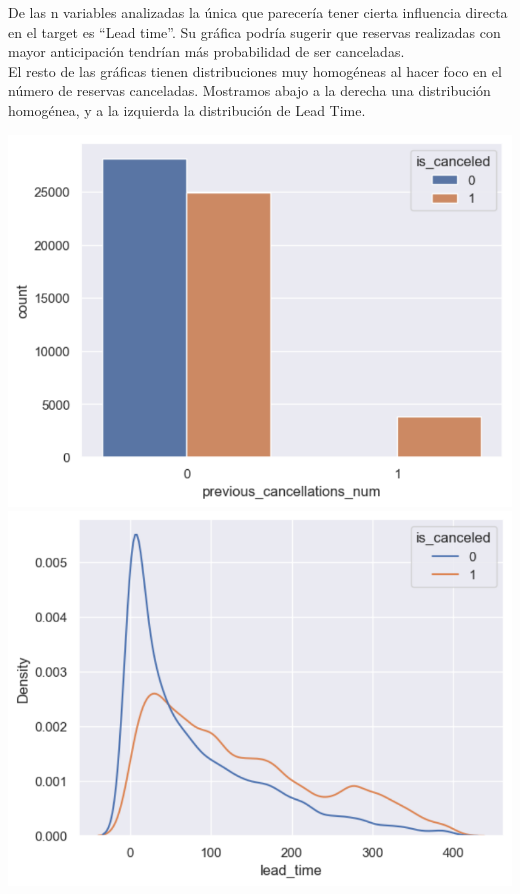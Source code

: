 \documentclass{article}
\begin{document}
De las n variables analizadas la única que parecería tener cierta influencia directa en el target es “Lead time”. Su gráfica podría sugerir que reservas realizadas con mayor anticipación tendrían más probabilidad de ser canceladas. \\
El resto de las gráficas tienen distribuciones muy homogéneas al hacer foco en el número de reservas canceladas. Mostramos abajo a la derecha una distribución homogénea, y a la izquierda la distribución de Lead Time.

\includegraphics[scale=0.2]{previous_cancellations_num}
    \hspace{4.5cm}
\includegraphics[scale=0.2]{lead_time}
\end{document}
